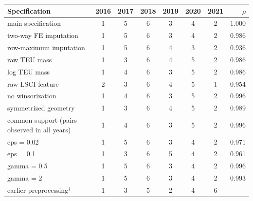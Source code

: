 \begin{tabular}{lccccccr}
\toprule
Specification & 2016 & 2017 & 2018 & 2019 & 2020 & 2021 & $\rho$\\
\midrule
main specification & 1 & 5 & 6 & 3 & 4 & 2 & 1.000\\
two-way FE imputation & 1 & 5 & 6 & 3 & 4 & 2 & 0.986\\
row-maximum imputation & 1 & 5 & 6 & 4 & 3 & 2 & 0.936\\
raw TEU mass & 1 & 3 & 6 & 4 & 5 & 2 & 0.986\\
log TEU mass & 1 & 4 & 6 & 3 & 5 & 2 & 0.986\\
raw LSCI feature & 2 & 3 & 6 & 4 & 5 & 1 & 0.954\\
no winsorization & 1 & 4 & 6 & 3 & 5 & 2 & 0.996\\
symmetrized geometry & 1 & 3 & 6 & 4 & 5 & 2 & 0.989\\
common support (pairs observed in all years) & 1 & 4 & 6 & 3 & 5 & 2 & 0.996\\
eps = 0.02 & 1 & 5 & 6 & 3 & 4 & 2 & 0.971\\
eps = 0.1 & 1 & 3 & 6 & 5 & 4 & 2 & 0.961\\
gamma = 0.5 & 1 & 5 & 6 & 3 & 4 & 2 & 0.996\\
gamma = 2 & 1 & 5 & 6 & 3 & 4 & 2 & 0.993\\
earlier preprocessing$^\dagger$ & 1 & 3 & 5 & 2 & 4 & 6 & --\\
\bottomrule
\end{tabular}
